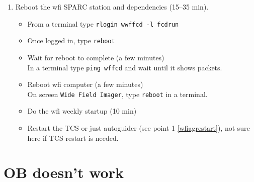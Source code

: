 \documentclass[11pt,fleqn]{book}
\def\procref#1{Procedure~\ref{proc:#1}, p.~\pageref{proc:#1}}
\def\figref#1{Fig.~\ref{fig:#1}, p.~\pageref{fig:#1}}
\begin{document}
\begin{enumerate}
\begin{enumerate}
       \item Deactivate the connection between \gls{feros} and TCS
           \begin{itemize}
                \item On the \gls{feros} screen (\figref{saladecontrol}), locate the \gls{feros} control panel (\figref{feroscon})
                \item From menu select \texttt{Telescope $\rightarrow$ IGNORE}
           \end{itemize}
       \item Perform a full restart the \gls{tcs} including VME reboot (\procref{startup})
       \item Reactivate the connection between \gls{feros} and TCS
           \begin{itemize}
                \item On the \gls{feros} screen (\figref{saladecontrol}), locate the \gls{feros} control panel (\figref{feroscon})
                \item From menu select \texttt{Telescope $\rightarrow$ ENABLE}
           \end{itemize}
    \end{enumerate}
    \item Reboot the \gls{wfi} SPARC station and dependencies (15--35 min).
    \begin{itemize}
        \item From a terminal type \texttt{rlogin \gls{wwffcd} -l fcdrun}
        \item Once logged in, type \texttt{reboot}
        \item Wait for reboot to complete (a few minutes)\\
              In a terminal type \texttt{ping wffcd} and wait until it shows packets.
        \item Reboot \gls{wfi} computer (a few minutes)\\
              On screen \texttt{Wide Field Imager}, type \texttt{reboot} in a terminal.
        \item Do the \gls{wfi} weekly startup (10 min)
        \item Restart the TCS or just autoguider (see point 1 \ref{wfiagrestart}), not sure here if TCS restart is needed.
    \end{itemize}
\end{enumerate}

\section{OB doesn't work}
\end{document}
